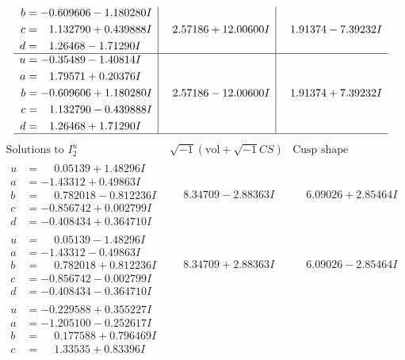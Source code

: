 \documentclass[1p]{elsarticle_modified}
\theoremstyle{definition}
\newcommand{\I}{\sqrt{-1}}
\begin{document}
$$\begin{array}{c|c|c}
\begin{aligned}
b &= -0.609606 - 1.180280 I \\
c &= \phantom{-}1.132790 + 0.439888 I \\
d &= \phantom{-}1.26468 - 1.71290 I\end{aligned}
 & \phantom{-}2.57186 + 12.00600 I & \phantom{-}1.91374 - 7.39232 I \\ \hline\begin{aligned}
u &= -0.35489 - 1.40814 I \\
a &= \phantom{-}1.79571 + 0.20376 I \\
b &= -0.609606 + 1.180280 I \\
c &= \phantom{-}1.132790 - 0.439888 I \\
d &= \phantom{-}1.26468 + 1.71290 I\end{aligned}
 & \phantom{-}2.57186 - 12.00600 I & \phantom{-}1.91374 + 7.39232 I\\
 \hline 
 \end{array}$$\newpage$$\begin{array}{c|c|c}  
\text{Solutions to }I^u_{2}& \I (\text{vol} + \sqrt{-1}CS) & \text{Cusp shape}\\
 \hline 
\begin{aligned}
u &= \phantom{-}0.05139 + 1.48296 I \\
a &= -1.43312 + 0.49863 I \\
b &= \phantom{-}0.782018 - 0.812236 I \\
c &= -0.856742 + 0.002799 I \\
d &= -0.408434 + 0.364710 I\end{aligned}
 & \phantom{-}8.34709 - 2.88363 I & \phantom{-}6.09026 + 2.85464 I \\ \hline\begin{aligned}
u &= \phantom{-}0.05139 - 1.48296 I \\
a &= -1.43312 - 0.49863 I \\
b &= \phantom{-}0.782018 + 0.812236 I \\
c &= -0.856742 - 0.002799 I \\
d &= -0.408434 - 0.364710 I\end{aligned}
 & \phantom{-}8.34709 + 2.88363 I & \phantom{-}6.09026 - 2.85464 I \\ \hline\begin{aligned}
u &= -0.229588 + 0.355227 I \\
a &= -1.205100 - 0.252617 I \\
b &= \phantom{-}0.177588 + 0.796469 I \\
c &= \phantom{-}1.33535 + 0.83396 I \\

\end{aligned}
\end{array}$$
\end{document}
